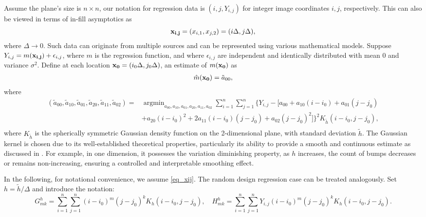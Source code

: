 \documentclass{article}
\def\uxij{\undertilde{x}_{i,j}}
\begin{document}
Assume the plane's size is $n\times n$, our notation for regression data is $(i,j,Y_{i,j})$ for integer image coordinates $i,j$, respectively. This can also be viewed in terms of in-fill asymptotics as \begin{equation}
	\label{eq_xij}
	{\bf x_{i,j}}=(x_{i,1},x_{j,2})=(i\Delta,j\Delta),
\end{equation}
where $\Delta\rightarrow 0$. Such data can originate from multiple sources and can be represented using various mathematical models. Suppose $Y_{i,j}=m({\bf x_{i,j}})+\epsilon_{i,j}$, where $m$ is the regression
function, and where $\epsilon_{i,j}$ are independent and identically distributed with mean 0 and variance $\sigma^2$.  Define at each location ${\bf x_{0}}=(i_0\Delta,j_0\Delta)$, an estimate of $m({\bf x_0})$ as
\begin{equation*}
	\begin{aligned}
		\hat{m}({\bf x_0}) = \tilde{a}_{00}, 
	\end{aligned}
\end{equation*}
where 
\begin{equation}
	\label{argmin}
	\begin{aligned}
		(\tilde{a}_{00},\tilde{a}_{10},\tilde{a}_{01},\tilde{a}_{20},\tilde{a}_{11},\tilde{a}_{02})
		=&\mathop{\arg\min}_{a_{00},a_{10},a_{01},a_{20},a_{11},a_{02}}\sum_{i=1}^{n}\sum_{j=1}^{n}\{Y_{i,j}-[a_{00}+a_{10}(i-i_0)+a_{01}(j-j_0)\\
		&+a_{20}(i-i_0)^2+2a_{11}(i-i_0)(j-j_0)+a_{02}(j-j_0)^2]\}^2K_{\tilde{h}}(i-i_0,j-j_0),\\
	\end{aligned}
\end{equation}
where $K_{\tilde{h}}$ is the spherically symmetric Gaussian density function on the 2-dimensional plane, with standard deviation $\tilde{h}$. The Gaussian kernel is chosen due to its well-established theoretical properties, particularly its ability to provide a smooth and continuous estimate  as discussed in \cite{chaudhuri1999sizer, chaudhuri2000scale}. For example, in one dimension, it possesses the variation diminishing property,  as $h$ increases, the count of bumps decreases or remains non-increasing, ensuring a controlled and interpretable smoothing effect.	

In the following, for notational convenience, we assume \eqref{eq_xij}. The random design regression case can be treated analogously. Set  $h=\tilde{h}/\Delta$ and introduce the notation:
\begin{equation*}
	G_{mk}^h = \sum_{i=1}^{n}\sum_{j=1}^{n} (i-i_0)^m (j-j_0)^k K_h(i-i_0,j-j_0), \quad H_{mk}^h = \sum_{i=1}^{n}\sum_{j=1}^{n} Y_{i,j} (i-i_0)^m (j-j_0)^k K_h(i-i_0,j-j_0).%
\end{equation*}
\end{document}
